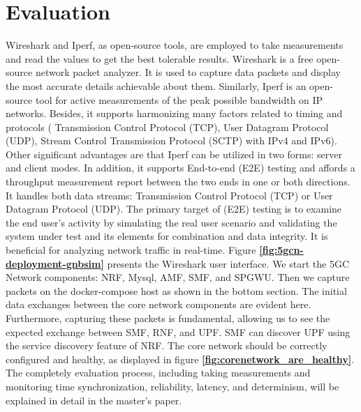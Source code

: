 \section{\textbf{Evaluation }}\label{sec:evaluation} 


Wireshark and Iperf, as open-source tools, are employed to take measurements and read the values to get the best tolerable results. 
Wireshark is a free open-source network packet analyzer. It is used to capture data packets and display the most accurate details achievable about them. Similarly, Iperf is an open-source tool for active measurements of the peak possible bandwidth on IP networks. Besides, it supports harmonizing many factors related to timing and protocols ( Transmission Control Protocol (TCP), User Datagram Protocol (UDP), Stream Control Transmission Protocol (SCTP) with IPv4 and IPv6)\cite{iperf2021}.
Other significant advantages are that Iperf can be utilized in two forms: server and client modes. In addition, it supports End-to-end (E2E) testing and affords a throughput measurement report between the two ends in one or both directions. It handles both data streams: Transmission Control Protocol (TCP) or User Datagram Protocol (UDP). The primary target of (E2E) testing is to examine the end user's activity by simulating the real user scenario and validating the system under test and its elements for combination and data integrity. It is beneficial for analyzing network traffic in real-time.
Figure \textbf{\ref{fig:5gcn-deployment-gnbsim}} presents the Wireshark user interface. We start the 5GC Network components: NRF, Mysql, AMF, SMF, and SPGWU. Then we capture packets on the docker-compose host as shown in the bottom section. The initial data exchanges between the core network components are evident here.
Furthermore, capturing these packets is fundamental, allowing us to see the expected exchange between SMF, RNF, and UPF. SMF can discover UPF using the service discovery feature of NRF. The core network should be correctly configured and healthy, as displayed in figure
\textbf{\ref{fig:corenetwork_are_healthy}}. The completely evaluation process, including taking measurements and monitoring time synchronization, reliability, latency, and determinism, will be explained in detail in the master's paper\cite{openairinterface2014}.
 
